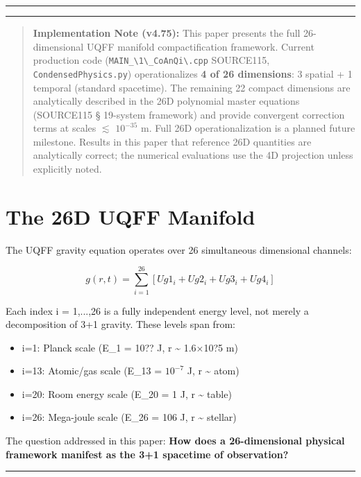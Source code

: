 \documentclass[12pt,a4paper]{article}
\begin{document}
\medskip\hrule\medskip

\medskip\hrule\medskip

\begin{quote}
\textbf{Implementation Note (v4.75):} This paper presents the full 26-dimensional UQFF
manifold compactification framework. Current production code (\texttt{MAIN\_\textbackslash {1\textbackslash \_CoAnQi\textbackslash }.cpp}
SOURCE115, \texttt{CondensedPhysics.py}) operationalizes \textbf{4 of 26 dimensions}: 3 spatial
+ 1 temporal (standard spacetime). The remaining 22 compact dimensions are
analytically described in the 26D polynomial master equations (SOURCE115 \S{} 19-system
framework) and provide convergent correction terms at scales $\lesssim$ $10^{-35}$ m. Full 26D
operationalization is a planned future milestone. Results in this paper that
reference 26D quantities are analytically correct; the numerical evaluations use the
4D projection unless explicitly noted.
\end{quote}

\section{The 26D UQFF Manifold}

The UQFF gravity equation operates over 26 simultaneous dimensional channels:

\begin{equation}
g(r,t) = \sum_{i=1}^{26} \left[ Ug1_i + Ug2_i + Ug3_i + Ug4_i \right]
\end{equation}

Each index i = 1,...,26 is a fully independent energy level, not merely a decomposition of 3+1 gravity. These levels span from:

\begin{itemize}
  \item i=1: Planck scale (E\_1 = 10?? J, r \textasciitilde{} 1.6$\times$10?5 m)
  \item i=13: Atomic/gas scale (E\_13 = $10^{-7}$ J, r \textasciitilde{} atom)
  \item i=20: Room energy scale (E\_20 = 1 J, r \textasciitilde{} table)
  \item i=26: Mega-joule scale (E\_26 = 106 J, r \textasciitilde{} stellar)
\end{itemize}

The question addressed in this paper: \textbf{How does a 26-dimensional physical framework manifest as the 3+1 spacetime of observation?}

\medskip\hrule\medskip
\end{document}
